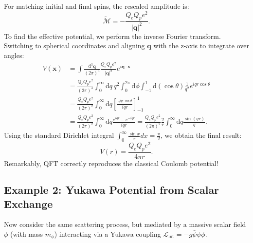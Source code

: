 For matching initial and final spins, the rescaled amplitude is:
\[
    \tilde{\mathcal{M}} = -\frac{Q_e Q_p e^2}{|\mathbf{q}|^2}.
\]
To find the effective potential, we perform the inverse Fourier transform. Switching to spherical coordinates and aligning $\mathbf{q}$ with the z-axis to integrate over angles:
\[
    \begin{aligned}
        V(\mathbf{x}) & = \int \frac{\mathrm{d}^3\mathbf{q}}{(2\pi)^3} \frac{Q_e Q_p e^2}{|\mathbf{q}|^2} e^{i\mathbf{q}\cdot\mathbf{x}}                                                                   \\
                      & = \frac{Q_e Q_p e^2}{(2\pi)^3} \int_0^\infty \mathrm{d} q \, q^2 \int_0^{2\pi} \mathrm{d} \phi \int_{-1}^1 \mathrm{d}(\cos\theta) \frac{1}{q^2} e^{iqr\cos\theta}                  \\
                      & = \frac{Q_e Q_p e^2}{(2\pi)^2} \int_0^\infty \mathrm{d} q \left[ \frac{e^{iqr\cos\theta}}{iqr} \right]_{-1}^1                                                                      \\
                      & = \frac{Q_e Q_p e^2}{(2\pi)^2} \int_0^\infty \mathrm{d} q \frac{e^{iqr} - e^{-iqr}}{iqr} = \frac{Q_e Q_p e^2}{(2\pi)^2} \frac{2}{r} \int_0^\infty \mathrm{d} q \frac{\sin(qr)}{q}.
    \end{aligned}
\]
Using the standard Dirichlet integral $\int_0^\infty \frac{\sin x}{x} dx = \frac{\pi}{2}$, we obtain the final result:
\[
    V(r) = \frac{Q_e Q_p e^2}{4\pi r}.
\]
Remarkably, QFT correctly reproduces the classical Coulomb potential!

\subsection{Example 2: Yukawa Potential from Scalar Exchange}
Now consider the same scattering process, but mediated by a massive scalar field $\phi$ (with mass $m_\phi$) interacting via a Yukawa coupling $\mathcal{L}_{\text{int}} = -g \bar{\psi} \psi \phi$.


